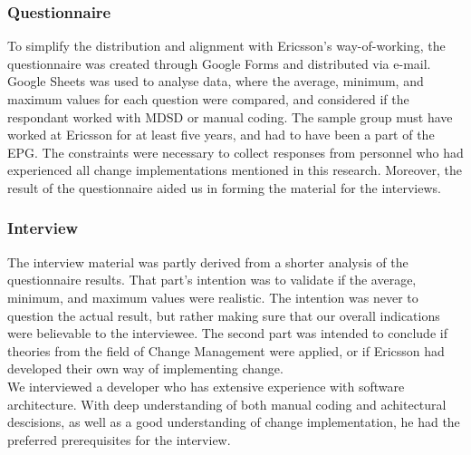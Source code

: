 \documentclass[final_report_innit.tex]{subfiles}
\begin{document}
\subsubsection{Questionnaire}\label{approachInQuest}
To simplify the distribution and alignment with Ericsson's way-of-working, the questionnaire was created through Google Forms and distributed via e-mail. Google Sheets was used to analyse data, where the average, minimum, and maximum values for each question were compared, and considered if the respondant worked with MDSD or manual coding. The sample group must have worked at Ericsson for at least five years, and had to have been a part of the EPG. The constraints were necessary to collect responses from personnel who had experienced all change implementations mentioned in this research. Moreover, the result of the questionnaire aided us in forming the material for the interviews. 
\\

\subsubsection{Interview}\label{approachInInt}
The interview material was partly derived from a shorter analysis of the questionnaire results. That part's intention was to validate if the average, minimum, and maximum values were realistic. The intention was never to question the actual result, but rather making sure that our overall indications were believable to the interviewee. The second part was intended to conclude if theories from the field of Change Management were applied, or if Ericsson had developed their own way of implementing change.
\\

We interviewed a developer who has extensive experience with software architecture. With deep understanding of both manual coding and achitectural descisions, as well as a good understanding of change implementation, he had the preferred prerequisites for the interview.
\end{document}
